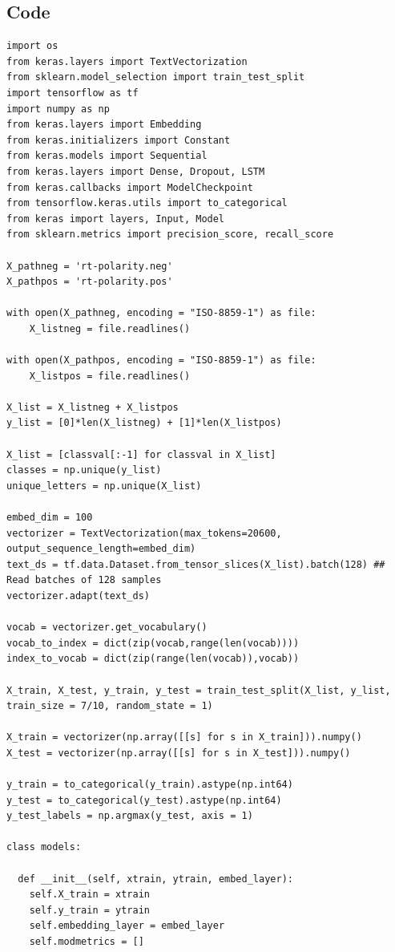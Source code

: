 \documentclass[12pt]{article}
\begin{document}
\subsection{Code}
\begin{lstlisting}[breaklines]
import os
from keras.layers import TextVectorization
from sklearn.model_selection import train_test_split
import tensorflow as tf
import numpy as np
from keras.layers import Embedding
from keras.initializers import Constant
from keras.models import Sequential
from keras.layers import Dense, Dropout, LSTM
from keras.callbacks import ModelCheckpoint
from tensorflow.keras.utils import to_categorical
from keras import layers, Input, Model
from sklearn.metrics import precision_score, recall_score

X_pathneg = 'rt-polarity.neg'
X_pathpos = 'rt-polarity.pos'

with open(X_pathneg, encoding = "ISO-8859-1") as file:
    X_listneg = file.readlines()

with open(X_pathpos, encoding = "ISO-8859-1") as file:
    X_listpos = file.readlines()
 
X_list = X_listneg + X_listpos
y_list = [0]*len(X_listneg) + [1]*len(X_listpos)

X_list = [classval[:-1] for classval in X_list]
classes = np.unique(y_list)
unique_letters = np.unique(X_list)

embed_dim = 100
vectorizer = TextVectorization(max_tokens=20600, output_sequence_length=embed_dim)
text_ds = tf.data.Dataset.from_tensor_slices(X_list).batch(128) ## Read batches of 128 samples
vectorizer.adapt(text_ds)

vocab = vectorizer.get_vocabulary()
vocab_to_index = dict(zip(vocab,range(len(vocab))))
index_to_vocab = dict(zip(range(len(vocab)),vocab))

X_train, X_test, y_train, y_test = train_test_split(X_list, y_list, train_size = 7/10, random_state = 1)

X_train = vectorizer(np.array([[s] for s in X_train])).numpy()
X_test = vectorizer(np.array([[s] for s in X_test])).numpy()

y_train = to_categorical(y_train).astype(np.int64)
y_test = to_categorical(y_test).astype(np.int64)
y_test_labels = np.argmax(y_test, axis = 1)

class models:

  def __init__(self, xtrain, ytrain, embed_layer):
    self.X_train = xtrain
    self.y_train = ytrain
    self.embedding_layer = embed_layer
    self.modmetrics = []


\end{lstlisting}
\end{document}
